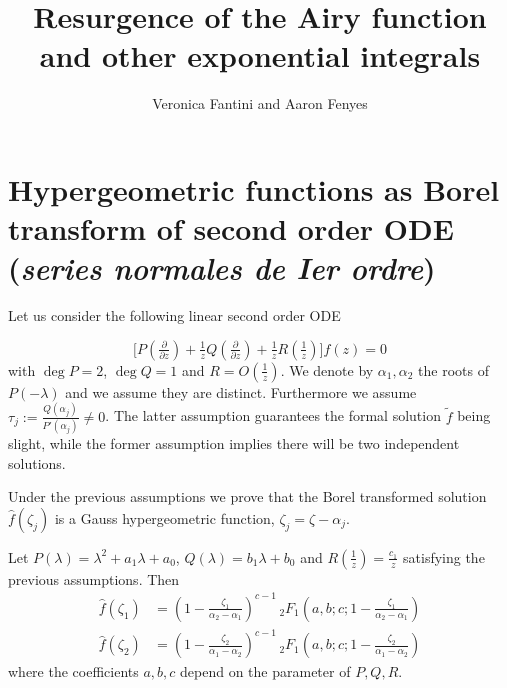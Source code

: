 \documentclass[11pt,a4paper,twoside,leqno,noamsfonts]{amsart}
\title{Resurgence of the Airy function \\ and other exponential integrals}
\author{Veronica Fantini and Aaron Fenyes}
\numberwithin{equation}{section}
\begin{document}
\maketitle
\section{Hypergeometric functions as Borel transform of second order ODE (\textit{series normales de \emph{I}er ordre})}

Let us consider the following linear second order ODE

\begin{equation}\label{eq}
\big[P(\tfrac{\partial}{\partial z})+\tfrac{1}{z}Q(\tfrac{\partial}{\partial z})+\tfrac{1}{z}R(\tfrac{1}{z})\big]f(z)=0
\end{equation}
with $\deg P=2$, $\deg Q=1$ and $R=O(\tfrac{1}{z})$. We denote by $\alpha_1,\alpha_2$ the roots of $P(-\lambda)$ and we assume they are distinct. Furthermore we assume $\tau_j:=\frac{Q(\alpha_j)}{P'(\alpha_j)}\neq 0$. The latter assumption guarantees the formal solution $\tilde{f}$ being slight, while the former assumption implies there will be two independent solutions. 

Under the previous assumptions we prove that the Borel transformed solution $\hat{f}(\zeta_j)$ is a Gauss hypergeometric function, $\zeta_j=\zeta-\alpha_j$.

\begin{prop}
Let $P(\lambda)=\lambda^2+a_1\lambda+a_0$, $Q(\lambda)=b_1\lambda+b_0$ and $R(\tfrac{1}{z})=\tfrac{c_1}{z}$ satisfying the previous assumptions. Then 
\begin{align}
\hat{f}(\zeta_1)&=\left(1-\frac{\zeta_1}{\alpha_2-\alpha_1}\right)^{c-1} \, {}_2F_1\left(a,b;c;1-\frac{\zeta_1}{\alpha_2-\alpha_1} \right)\\
\hat{f}(\zeta_2)&=\left(1-\frac{\zeta_2}{\alpha_1-\alpha_2}\right)^{c-1} \, {}_2F_1\left(a,b;c;1-\frac{\zeta_2}{\alpha_1-\alpha_2} \right)
\end{align}
where the coefficients $a,b,c$ depend on the parameter of $P,Q,R$. 
\end{prop}
\end{document}
